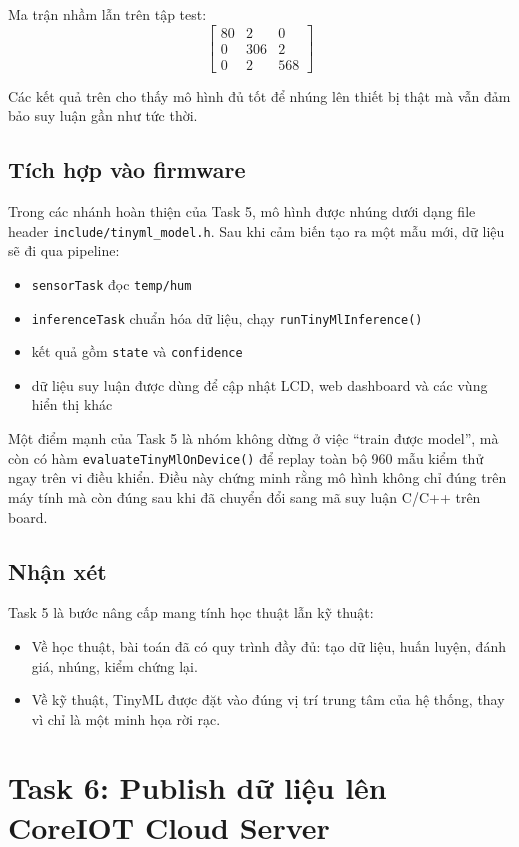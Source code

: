 \documentclass[12pt,a4paper]{article}
\begin{document}
Ma trận nhầm lẫn trên tập test:
\[
\begin{bmatrix}
80 & 2 & 0 \\
0 & 306 & 2 \\
0 & 2 & 568
\end{bmatrix}
\]

Các kết quả trên cho thấy mô hình đủ tốt để nhúng lên thiết bị thật mà vẫn đảm bảo suy luận gần như tức thời.

\subsection{Tích hợp vào firmware}

Trong các nhánh hoàn thiện của Task 5, mô hình được nhúng dưới dạng file header \texttt{include/tinyml\_model.h}. Sau khi cảm biến tạo ra một mẫu mới, dữ liệu sẽ đi qua pipeline:
\begin{itemize}
  \item \texttt{sensorTask} đọc \texttt{temp/hum}
  \item \texttt{inferenceTask} chuẩn hóa dữ liệu, chạy \texttt{runTinyMlInference()}
  \item kết quả gồm \texttt{state} và \texttt{confidence}
  \item dữ liệu suy luận được dùng để cập nhật LCD, web dashboard và các vùng hiển thị khác
\end{itemize}

Một điểm mạnh của Task 5 là nhóm không dừng ở việc ``train được model'', mà còn có hàm \texttt{evaluateTinyMlOnDevice()} để replay toàn bộ 960 mẫu kiểm thử ngay trên vi điều khiển. Điều này chứng minh rằng mô hình không chỉ đúng trên máy tính mà còn đúng sau khi đã chuyển đổi sang mã suy luận C/C++ trên board.

\subsection{Nhận xét}

Task 5 là bước nâng cấp mang tính học thuật lẫn kỹ thuật:
\begin{itemize}
  \item Về học thuật, bài toán đã có quy trình đầy đủ: tạo dữ liệu, huấn luyện, đánh giá, nhúng, kiểm chứng lại.
  \item Về kỹ thuật, TinyML được đặt vào đúng vị trí trung tâm của hệ thống, thay vì chỉ là một minh họa rời rạc.
\end{itemize}

\section{Task 6: Publish dữ liệu lên CoreIOT Cloud Server}
\end{document}
